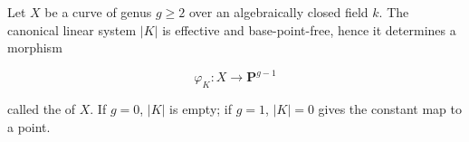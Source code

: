 Let $X$ be a curve of genus $g \geqslant 2$ over an algebraically closed field $k$. The canonical linear system $|K|$ is effective and base-point-free, hence it determines a morphism

$$\varphi_K: X \to \mathbf{P}^{g-1}$$

called the  of $X$. If $g = 0$, $|K|$ is empty; if $g = 1$, $|K| = 0$ gives the constant map to a point.
